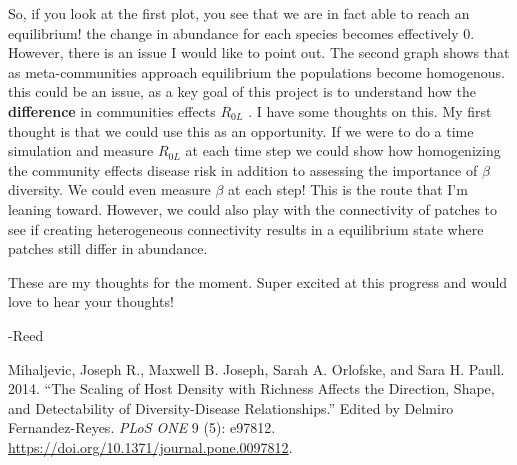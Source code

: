 \documentclass[
  letterpaper,
  DIV=11,
  numbers=noendperiod]{scrartcl}
\newlength{\cslhangindent}
\newenvironment{CSLReferences}[2] %
 {\begin{list}{}{%
  \setlength{\itemindent}{0pt}
  \setlength{\leftmargin}{0pt}
  \setlength{\parsep}{0pt}
  \ifodd #1
   \setlength{\leftmargin}{\cslhangindent}
   \setlength{\itemindent}{-1\cslhangindent}
  \fi
  \setlength{\itemsep}{#2\baselineskip}}}
 {\end{list}}
\begin{document}
So, if you look at the first plot, you see that we are in fact able to
reach an equilibrium! the change in abundance for each species becomes
effectively 0. However, there is an issue I would like to point out. The
second graph shows that as meta-communities approach equilibrium the
populations become homogenous. this could be an issue, as a key goal of
this project is to understand how the \textbf{difference} in communities
effects \(R_{0L}\) . I have some thoughts on this. My first thought is
that we could use this as an opportunity. If we were to do a time
simulation and measure \(R_{0L}\) at each time step we could show how
homogenizing the community effects disease risk in addition to assessing
the importance of \(\beta\) diversity. We could even measure \(\beta\)
at each step! This is the route that I'm leaning toward. However, we
could also play with the connectivity of patches to see if creating
heterogeneous connectivity results in a equilibrium state where patches
still differ in abundance.

These are my thoughts for the moment. Super excited at this progress and
would love to hear your thoughts!

-Reed

\label{refs}
\begin{CSLReferences}{1}{0}
Mihaljevic, Joseph R., Maxwell B. Joseph, Sarah A. Orlofske, and Sara H.
Paull. 2014. {``The Scaling of Host Density with Richness Affects the
Direction, Shape, and Detectability of Diversity-Disease
Relationships.''} Edited by Delmiro Fernandez-Reyes. \emph{PLoS ONE} 9
(5): e97812. \url{https://doi.org/10.1371/journal.pone.0097812}.

\end{CSLReferences}
\end{document}
